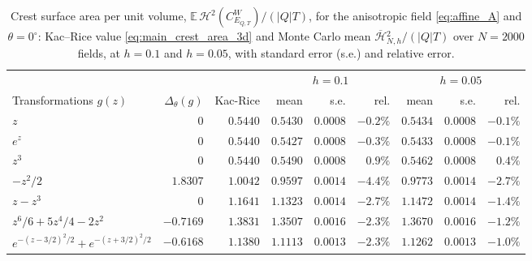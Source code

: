 \begin{table}[H]
\centering
\small
\caption{Crest surface area per unit volume, $\mathbb E\,\mathcal H^2(C^W_{E_{Q,T}})/(|Q|T)$, for the anisotropic field \eqref{eq:affine_A} and $\theta=0^\circ$: Kac--Rice value \eqref{eq:main_crest_area_3d} and Monte Carlo mean $\overline{\mathcal H}{}^2_{N,h}/(|Q|T)$ over $N=2000$ fields, at $h=0.1$ and $h=0.05$, with standard error (s.e.) and relative error.}
\label{tab:airy_audit}
\renewcommand{\arraystretch}{1.15}
\setlength{\tabcolsep}{4pt}
\begin{tabular}{l|rrrrrrrr}
\hline
& & & \multicolumn{3}{c}{$h=0.1$} & \multicolumn{3}{c}{$h=0.05$}\\
Transformations $g(z)$ & $\Delta_\theta(g)$ & Kac-Rice & mean & s.e. & rel. & mean & s.e. & rel.\\
\hline
$z$ & $0$ & $0.5440$ & $0.5430$ & $0.0008$ & $-0.2\%$ & $0.5434$ & $0.0008$ & $-0.1\%$\\
$e^{z}$ & $0$ & $0.5440$ & $0.5427$ & $0.0008$ & $-0.3\%$ & $0.5433$ & $0.0008$ & $-0.1\%$\\
$z^3$ & $0$ & $0.5440$ & $0.5490$ & $0.0008$ & $0.9\%$ & $0.5462$ & $0.0008$ & $0.4\%$\\
$-z^2/2$ & $1.8307$ & $1.0042$ & $0.9597$ & $0.0014$ & $-4.4\%$ & $0.9773$ & $0.0014$ & $-2.7\%$\\
$z-z^3$ & $0$ & $1.1641$ & $1.1323$ & $0.0014$ & $-2.7\%$ & $1.1472$ & $0.0014$ & $-1.4\%$\\
$z^6/6+5z^4/4-2z^2$ & $-0.7169$ & $1.3831$ & $1.3507$ & $0.0016$ & $-2.3\%$ & $1.3670$ & $0.0016$ & $-1.2\%$\\
$e^{-(z-3/2)^2/2}+e^{-(z+3/2)^2/2}$ & $-0.6168$ & $1.1380$ & $1.1113$ & $0.0013$ & $-2.3\%$ & $1.1262$ & $0.0013$ & $-1.0\%$\\
\hline
\end{tabular}
\end{table}
